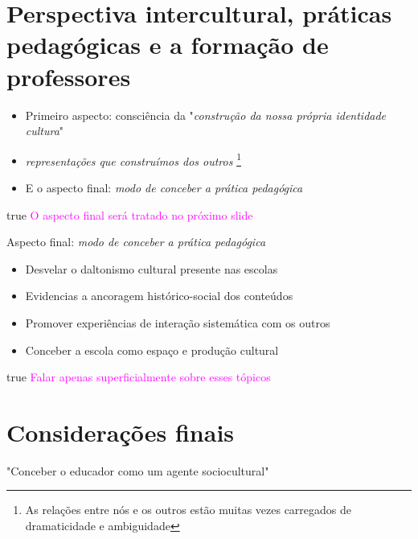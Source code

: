 \documentclass[]{beamer}
\newcommand{\obs}[1]{{
  \ifdefined\DRAFT
    \textcolor{magenta}{#1}
  \fi
}}
\def\DRAFT{true}
\begin{document}
  \section{Perspectiva intercultural, práticas pedagógicas e a formação de
  professores}

  \begin{frame}{\secname *}
    \begin{itemize}
      \item
        Primeiro aspecto: consciência da "\emph{construção da nossa própria
        identidade cultura}"

      \item
        \emph{representações que construímos dos \emph{outros}}
        \footnote{
          As relações entre nós e os outros estão muitas vezes carregados de
          dramaticidade e ambiguidade
        }

      \item
        E o aspecto final: \emph{modo de conceber a prática pedagógica}
    \end{itemize}

    \obs{
      O aspecto final será tratado no próximo slide
    }
  \end{frame}

  \begin{frame}{Aspecto final: \emph{modo de conceber a prática pedagógica}}
    \begin{itemize}
      \item Desvelar o daltonismo cultural presente nas escolas
      \item Evidencias a ancoragem histórico-social dos conteúdos
      \item Promover experiências de interação sistemática com os outros
      \item Conceber a escola como espaço e produção cultural
    \end{itemize}

    \obs{
      Falar apenas superficialmente sobre esses tópicos
    }
  \end{frame}

  \section{Considerações finais}

  \begin{frame}{\secname *}
    \Huge "Conceber o educador como um agente sociocultural"
  \end{frame}

  
  
\end{document}
